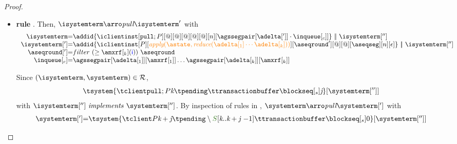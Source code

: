 \begin{proof}
\begin{itemize}
\begin{itemize}
	
	\item {\bf rule }. Then, $\isystemterm  \arroi{\pulltran} \isystemterm '$ with 
				\[\begin{array}{r@{=}l}
					\isystemterm & \addid{\iclientinst[\tpullins][@]
						[@]%
						[@][@][@][n][{\agssegpair[{\adelta[']}]}\cdot\inclient]}
								\ \bigpar \ \isystemterm['']
					\\
					\isystemterm['] & \addid{\iclientinst[P]
						 [\iapply{\known}{\ireduce{\adelta[_1]\cdots\adelta[_k]}}]
						 [\aseqround']
						 [@][@]
						 [{\receivebuffer}][n][\epsilon]}\ \bigpar \ \isystemterm['']	\\
					   \aseqround['] & filter\ (\geq \amxrf[_k](\cid)) \ \aseqround \\
						\inclient & \agssegpair[{\adelta[_1]}][{\amxrf[_1]}]\ldots \agssegpair[{\adelta[_k]}][{\amxrf[_k]}]
				  \end{array}
				\]
		
				Since $(\isystemterm,\systemterm)\in \mathcal{R}$,
				\[\tsystem{\tclienti{\tpullins}{\tknown}{\tpending}{\ttransactionbuffer}{\tsent}{\treceivebuffer}}[{\systemterm['']}] \]
				with $\implements{\isystemterm['']}{\systemterm['']}$. By inspection of rules in \figref{}, 
				$\systemterm \arroi{\pulltran} \systemterm[']$ with
				\[\begin{array}{r@{=}l}
					\systemterm['] &  \tsystem{\tclienti{\tprogram}{\tknown+\treceivebuffer}{\tpending \setminus \queuemessage[\tknown .. \tknown + \treceivebuffer {\ -1}]}{\ttransactionbuffer}{\tsent}{0}}[{\systemterm['']}]	
				  \end{array}		
				\]
				

\end{itemize}
\end{itemize}
\end{proof}
